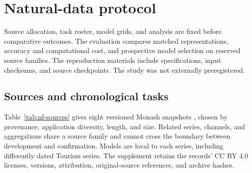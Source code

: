 \section{Natural-data protocol}
\label{sec:nf-protocol}

Source allocation, task roster, model grids, and analysis are fixed before
comparative outcomes.  The evaluation compares matched representations, accuracy and computational
cost, and prospective model selection on reserved source families. The
reproduction materials include specifications, input checksums, and source
checkpoints. The study was not externally preregistered.

\subsection{Sources and chronological tasks}
\label{sec:nf-data}

Table~\ref{tab:nf-sources} gives eight versioned Monash snapshots
\citep{Godahewa2021Monash}, chosen by provenance, application diversity, length,
and size.  Related series, channels, and aggregations share a source family
and cannot cross the boundary between development and confirmation.  Models are local to
each series, including differently dated Tourism series.  The supplement
retains the records' CC BY 4.0 licenses, versions, attribution, original-source
references, and archive hashes.

